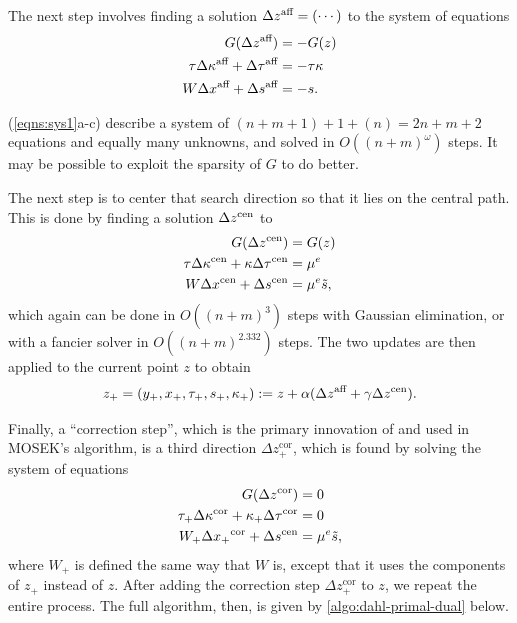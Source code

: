 \begin{subappendices}
\begin{lproof}
    The next step involves finding a solution $\Delta {z}^{\text{aff}} = (\cdots)$
    to the system of equations
    \begin{subequations} \label{eqns:sys1}
    \begin{align}
        G(\Delta {z}^{\text{aff}}) &= -G(z) \\
        \tau \Delta {\kappa}^{\text{aff}} + \Delta {\tau}^{\text{aff}} &= - \tau \kappa \\
        W \Delta {x}^{\text{aff}} + \Delta {s}^{\text{aff}} &= -s.
    \end{align}
    \end{subequations}

    (\ref{eqns:sys1}a-c) describe a system of $(n + m + 1) + 1 + (n) = 2n + m + 2$ equations and equally many unknowns,
    and solved in $O((n+m)^\omega)$ steps.
    It may be possible to exploit the sparsity of $G$ to do better.

    The next step is to center that search direction so that it lies on the central path. This is done by finding a solution $\Delta {z}^{\text{cen}}$ to
    \begin{subequations}\label{eqns:sys2}
    \begin{align}
        G(\Delta {z}^{\text{cen}}) &= G(z) \\
        \tau \Delta {\kappa}^{\text{cen}} + \kappa \Delta {\tau}^{\text{cen}} &= \mu^e \\
        W \Delta {x}^{\text{cen}} + \Delta {s}^{\text{cen}} &= \mu^e \tilde s,
    \end{align}
    \end{subequations}
    which again can be done in $O((n+m)^3)$ steps with Gaussian elimination, or
    with a fancier solver in $O((n+m)^2.332)$ steps.
    The two updates are then applied to the current point $z$ to obtain
    \[
        z_+ = (y_+, x_+, \tau_+, s_+, \kappa_+) := z + \alpha (\Delta {z}^{\text{aff}} + \gamma \Delta {z}^{\text{cen}}).
    \]

    Finally, a ``correction step'', which is the primary innovation of \textcite{badenbroek2021algorithm} and used in MOSEK's algorithm,
    is a third direction $\Delta z_+^{\text{cor}}$, which is found by solving the system of equations
    \begin{subequations}\label{eqns:sys3}
    \begin{align}
        G(\Delta z^{\text{cor}}) &= 0 \\
        \tau_+ \Delta \kappa^{\text{cor}}  + \kappa_+ \Delta \tau^{\text{cor}} &= 0 \\
        W_+ \Delta {x_+}^{\text{cor}} + \Delta {s}^{\text{cen}} &= \mu^e \tilde s,
    \end{align}
    \end{subequations}
    where
    $W_+$ is defined the same way that $W$ is, except that it uses the components of $z_+$ instead of $z$.
    After adding the correction step $\Delta z_+^{\text{cor}}$ to $z$, we repeat the entire process. The full algorithm, then, is
    given by \cref{algo:dahl-primal-dual} below. 


\end{lproof}
\end{subappendices}
